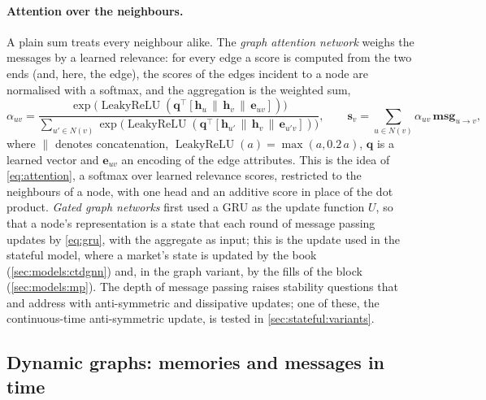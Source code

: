 \paragraph{Attention over the neighbours.}  A plain sum treats every neighbour alike.
The \emph{graph attention network} \cite{velickovic2018gat} weighs the messages by a
learned relevance: for every edge a score is computed from the two ends (and, here, the
edge), the scores of the edges incident to a node are normalised with a softmax, and the
aggregation is the weighted sum,
\begin{equation}
  \alpha_{uv} = \frac{\exp\bigl(\operatorname{LeakyReLU}(\mathbf{q}^{\top} [\mathbf{h}_u \,\|\, \mathbf{h}_v \,\|\, \mathbf{e}_{uv}])\bigr)}
  {\sum_{u' \in N(v)} \exp\bigl(\operatorname{LeakyReLU}(\mathbf{q}^{\top} [\mathbf{h}_{u'} \,\|\, \mathbf{h}_v \,\|\, \mathbf{e}_{u'v}])\bigr)},
  \qquad
  \mathbf{s}_v = \sum_{u \in N(v)} \alpha_{uv}\, \mathbf{msg}_{u \to v},
  \label{eq:gat}
\end{equation}
where $\|$ denotes concatenation, $\operatorname{LeakyReLU}(a) = \max(a, 0.2\,a)$,
$\mathbf{q}$ is a learned vector and $\mathbf{e}_{uv}$ an encoding of the edge attributes.
This is the idea of \cref{eq:attention}, a softmax over learned relevance scores, restricted
to the neighbours of a node, with one head and an additive score in place of the dot
product.  \emph{Gated graph networks} \cite{li2016ggnn}
first used a GRU as the update function $U$, so that a node's representation is a state
that each round of message passing updates by \cref{eq:gru}, with the aggregate as input;
this is the update used in the stateful model, where a market's state is updated by the
book (\cref{sec:models:ctdgnn}) and, in the graph variant, by the fills of the block
(\cref{sec:models:mp}).  The depth of message passing raises stability questions that
\textcite{gravina2023antisymmetric} and \textcite{ceni2025mpssm} address with
anti-symmetric and dissipative updates; one of these, the continuous-time anti-symmetric
update, is tested in \cref{sec:stateful:variants}.

\subsection{Dynamic graphs: memories and messages in time}
\label{sec:bg:dyn}

